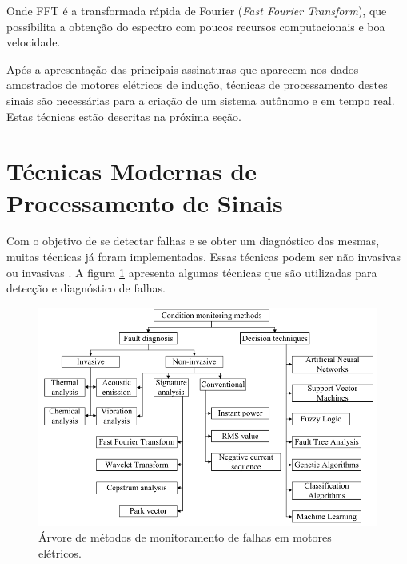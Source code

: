Onde FFT é a transformada rápida de Fourier (\textit{Fast Fourier Transform}), que possibilita a obtenção do espectro com poucos recursos
computacionais e boa velocidade.

Após a apresentação das principais assinaturas que aparecem nos dados amostrados de motores elétricos de indução, técnicas de processamento
destes sinais são necessárias para a criação de um sistema autônomo e em tempo real. Estas técnicas estão descritas na próxima seção.


% 

\section{Técnicas Modernas de Processamento de Sinais}\label{sec:}

Com o objetivo de se detectar falhas e se obter um diagnóstico das mesmas, muitas técnicas já foram implementadas. Essas técnicas podem ser
não invasivas ou invasivas \cite{Gorbounov2018}. A figura \ref{fig:monitoring_methods_rilski_p78} apresenta algumas técnicas que são
utilizadas para detecção e diagnóstico de falhas.

\begin{figure}[H]
    \caption{Árvore de métodos de monitoramento de falhas em motores elétricos.}
    \begin{center}
        \includegraphics[scale=.5]{referencial/img/monitoring_methods_rilski_p78.png}
    \end{center}
    \label{fig:monitoring_methods_rilski_p78}
\end{figure}

